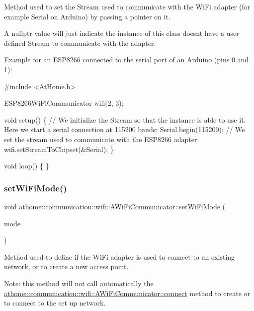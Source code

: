 Method used to set the Stream used to communicate with the Wi\+Fi adapter (for example Serial on Arduino) by passing a pointer on it.

A {\ttfamily nullptr} value will just indicate the instance of this class doesn\textquotesingle{}t have a user defined Stream to communicate with the adapter.

Example for an E\+S\+P8266 connected to the serial port of an Arduino (pins 0 and 1)\+:


\begin{DoxyCode}
\textcolor{preprocessor}{#include <AtHome.h>}

ESP8266WiFiCommunicator wifi(2, 3);

\textcolor{keywordtype}{void} setup() \{
  \textcolor{comment}{// We initialize the Stream so that the instance is able to use it. Here we start a serial connection at
       115200 bauds:}
  Serial.begin(115200);
  \textcolor{comment}{// We set the stream used to communicate with the ESP8266 adapter:}
  wifi.setStreamToChipset(&Serial);
\}

\textcolor{keywordtype}{void} loop() \{
\}
\end{DoxyCode}
 \mbox{\label{classathome_1_1communication_1_1wifi_1_1_a_wi_fi_communicator_a28538cf510da8b59056b2533a6e53bcc}} 
\subsubsection{\texorpdfstring{set\+Wi\+Fi\+Mode()}{setWiFiMode()}}
{\footnotesize\ttfamily void athome\+::communication\+::wifi\+::\+A\+Wi\+Fi\+Communicator\+::set\+Wi\+Fi\+Mode (\begin{DoxyParamCaption}\item[{wifi\+\_\+mode}]{mode }\end{DoxyParamCaption})}

Method used to define if the Wi\+Fi adapter is used to connect to an existing network, or to create a new access point.

Note\+: this method will not call automatically the \mbox{\hyperlink{classathome_1_1communication_1_1wifi_1_1_a_wi_fi_communicator_a309927109fbc19aa0fb2afb71d50bbf9}{athome\+::communication\+::wifi\+::\+A\+Wi\+Fi\+Communicator\+::connect}} method to create or to connect to the set up network.

